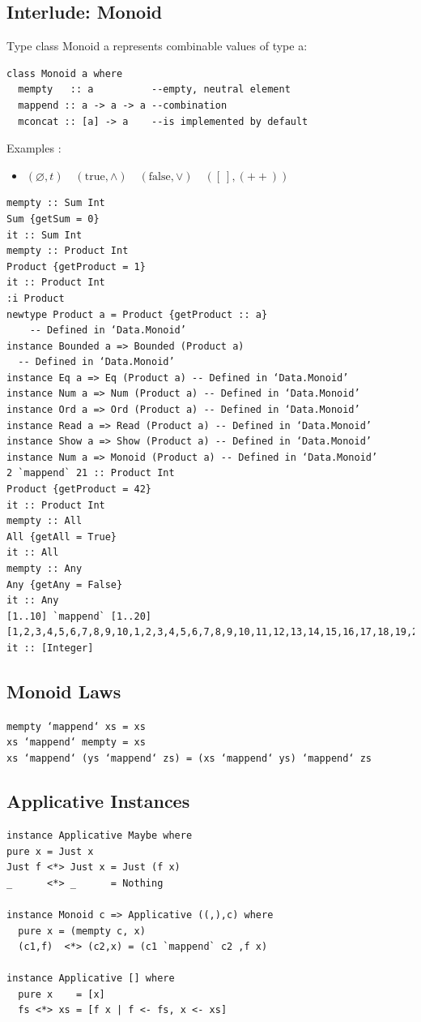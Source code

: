 \documentclass{article}
\newcommand{\Haskell}[1]{\texttt{#1}}
\begin{document}
\subsection{Interlude: Monoid}
Type class Monoid a represents combinable values of type  a:
\begin{verbatim}
class Monoid a where
  mempty   :: a          --empty, neutral element
  mappend :: a -> a -> a --combination
  mconcat :: [a] -> a    --is implemented by default
\end{verbatim}
Examples :
\begin{itemize}
\item $(\varnothing,t)\quad (\mathrm{true},\land) \quad (\mathrm{false},\lor)\quad ([ \ ],({++}))$
\end{itemize}
\begin{verbatim}
mempty :: Sum Int
Sum {getSum = 0}
it :: Sum Int
mempty :: Product Int
Product {getProduct = 1}
it :: Product Int
:i Product
newtype Product a = Product {getProduct :: a}
  	-- Defined in ‘Data.Monoid’
instance Bounded a => Bounded (Product a)
  -- Defined in ‘Data.Monoid’
instance Eq a => Eq (Product a) -- Defined in ‘Data.Monoid’
instance Num a => Num (Product a) -- Defined in ‘Data.Monoid’
instance Ord a => Ord (Product a) -- Defined in ‘Data.Monoid’
instance Read a => Read (Product a) -- Defined in ‘Data.Monoid’
instance Show a => Show (Product a) -- Defined in ‘Data.Monoid’
instance Num a => Monoid (Product a) -- Defined in ‘Data.Monoid’
2 `mappend` 21 :: Product Int
Product {getProduct = 42}
it :: Product Int
mempty :: All
All {getAll = True}
it :: All
mempty :: Any
Any {getAny = False}
it :: Any
[1..10] `mappend` [1..20]
[1,2,3,4,5,6,7,8,9,10,1,2,3,4,5,6,7,8,9,10,11,12,13,14,15,16,17,18,19,20]
it :: [Integer]
\end{verbatim}
\subsection{Monoid Laws}
\Haskell{mempty `mappend` xs = xs}\\
\Haskell{xs `mappend` mempty = xs}\\
\Haskell{xs `mappend` (ys `mappend` zs) = (xs `mappend` ys) `mappend` zs}
\subsection{Applicative Instances}
\begin{verbatim}
instance Applicative Maybe where
pure x = Just x
Just f <*> Just x = Just (f x)
_      <*> _      = Nothing

instance Monoid c => Applicative ((,),c) where
  pure x = (mempty c, x)
  (c1,f)  <*> (c2,x) = (c1 `mappend` c2 ,f x)

instance Applicative [] where
  pure x    = [x]
  fs <*> xs = [f x | f <- fs, x <- xs] 
\end{verbatim}
\clearpage
\end{document}
